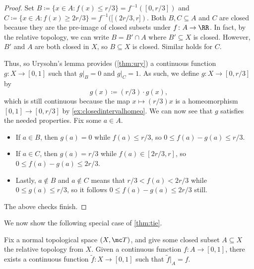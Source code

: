\documentclass[../notes.tex]{subfiles}
\begin{document}
\begin{proof}
	Set $B \coloneqq\{x\in A:f(x)\le r/3\}=f^{-1}([0,r/3])$ and $C \coloneqq\{x\in A:f(x)\ge 2r/3\}=f^{-1}([(2r/3,r])$. Both $B,C\subseteq A$ and $C$ are closed because they are the pre-image of closed subsets under $f\colon A\to\RR$. In fact, by the relative topology, we can write $B=B'\cap A$ where $B'\subseteq X$ is closed. However, $B'$ and $A$ are both closed in $X$, so $B\subseteq X$ is closed. Similar holds for $C$.
	
	Thus, so Urysohn's lemma provides (\autoref{thm:ury}) a continuous function $g\colon X\to[0,1]$ such that $g|_B=0$ and $g|_C=1$. As such, we define $g\colon X\to[0,r/3]$ by
	\[g(x)\coloneqq(r/3)\cdot g(x),\]
	which is still continuous because the map $x\mapsto(r/3)x$ is a homeomorphism $[0,1]\to[0,r/3]$ by \autoref{ex:closedintervalhomeo}. We can now see that $g$ satisfies the needed properties. Fix some $a\in A$.
	\begin{itemize}
		\item If $a\in B$, then $g(a)=0$ while $f(a)\le r/3$, so $0\le f(a)-g(a)\le r/3$.
		\item If $a\in C$, then $g(a)=r/3$ while $f(a)\in[2r/3,r]$, so $0\le f(a)-g(a)\le 2r/3$.
		\item Lastly, $a\notin B$ and $a\notin C$ means that $r/3<f(a)<2r/3$ while $0\le g(a)\le r/3$, so it follows $0\le f(a)-g(a)\le 2r/3$ still.
	\end{itemize}
	The above checks finish.
\end{proof}
We now show the following special case of \autoref{thm:tie}.
\begin{prop} \label{prop:finitetie}
	Fix a normal topological space $(X,\mc T)$, and give some closed subset $A\subseteq X$ the relative topology from $X$. Given a continuous function $f\colon A\to[0,1]$, there exists a continuous function $\widetilde f\colon X\to[0,1]$ such that $\widetilde f|_A=f$.
\end{prop}
\end{document}
